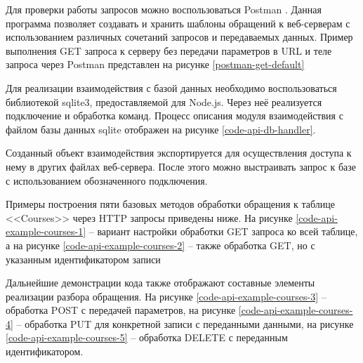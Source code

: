 Для проверки работы запросов можно воспользоваться Postman \cite{postman}.
Данная программа позволяет создавать и хранить шаблоны обращений к веб-серверам с использованием различных сочетаний запросов и передаваемых данных.
Пример выполнения GET запроса к серверу без передачи параметров в URL и теле запроса через Postman представлен на рисунке \ref{postman-get-default}


Для реализации взаимодействия с базой данных необходимо воспользоваться библиотекой sqlite3, предоставляемой для Node.js.
Через неё реализуется подключение и обработка команд.
Процесс описания модуля взаимодействия с файлом базы данных sqlite отображен на рисунке \ref{code-api-db-handler}.


Созданный объект взаимодействия экспортируется для осуществления доступа к нему в других файлах веб-сервера.
После этого можно выстраивать запрос к базе с использованием обозначенного подключения.

Примеры построения пяти базовых методов обработки обращения к таблице <<Courses>> через HTTP запросы приведены ниже.
На рисунке \ref{code-api-example-courses-1} -- вариант настройки обработки GET запроса ко всей таблице, а на рисунке \ref{code-api-example-courses-2} -- также обработка GET, но с указанным идентификатором записи



Дальнейшие демонстрации кода также отображают составные элементы реализации разбора обращения.
На рисунке \ref{code-api-example-courses-3} -- обработка POST с передачей параметров, на рисунке \ref{code-api-example-courses-4} -- обработка PUT для конкретной записи с переданными данными,
на рисунке \ref{code-api-example-courses-5} -- обработка DELETE с переданным идентификатором.


